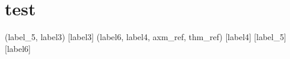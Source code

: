 \documentclass[lualatex, ja=standard]{bxjsarticle}
\begin{document}
\section{test}
\label{axm_ref}
\label{thm_ref}


\begin{prf}
   {
     (label_5, label3) {
       [label3] (label6, label4, axm_ref, thm_ref)
       [label4]
    }
     [label_5]
     [label6]
  }
\end{prf}
\end{document}
